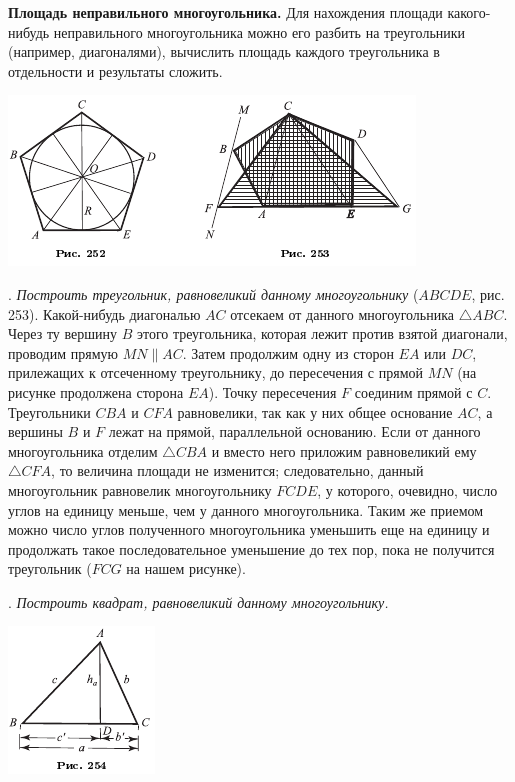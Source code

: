 \documentclass[oneside]{book}
\begin{document}
\textbf{Площадь неправильного многоугольника.}
Для нахождения площади какого-нибудь неправильного многоугольника можно его разбить на треугольники (например, диагоналями), вычислить площадь каждого треугольника в отдельности и результаты сложить.

\includegraphics{pics/ris-252-253}

.
\emph{Построить треугольник, равновеликий данному многоугольнику} ($ABCDE$, рис. 253).
Какой-нибудь диагональю $AC$ отсекаем от данного многоугольника $\triangle ABC$.
Через ту вершину $B$ этого треугольника, которая лежит против взятой диагонали, проводим прямую $MN\parallel AC$.
Затем продолжим одну из сторон $EA$ или $DC$, прилежащих к отсеченному треугольнику, до пересечения с прямой $MN$ (на рисунке продолжена сторона $EA$).
Точку пересечения $F$ соединим прямой с $C$.
Треугольники $CBA$ и $CFA$ равновелики, так как у них общее основание $AC$, а вершины $B$ и $F$ лежат на прямой, параллельной основанию.
Если от данного многоугольника отделим $\triangle CBA$ и вместо него приложим равновеликий ему $\triangle CFA$, то величина площади не изменится;
следовательно, данный многоугольник равновелик многоугольнику $FCDE$, у которого, очевидно, число углов на единицу меньше, чем у данного многоугольника.
Таким же приемом можно число углов полученного многоугольника уменьшить еще на единицу и продолжать такое последовательное уменьшение до тех пор, пока не получится треугольник ($FCG$ на нашем рисунке).

.
\emph{Построить квадрат, равновеликий данному многоугольнику.}

\includegraphics{pics/ris-254}
\end{document}
